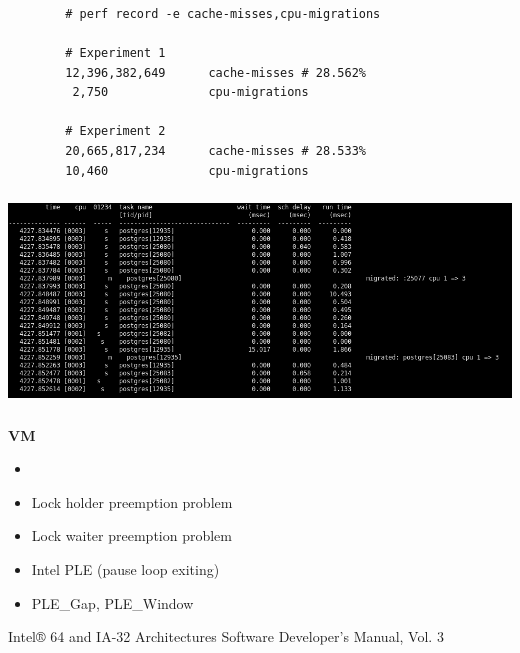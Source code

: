 \documentclass[usenames,dvipsnames, 18pt, compress, aspectratio=169]{beamer}
\begin{document}
\begin{frame}[fragile]{}
    \frametitle{}
    \begin{center}

        \begin{verbatim}
        # perf record -e cache-misses,cpu-migrations

        # Experiment 1
        12,396,382,649      cache-misses # 28.562%
         2,750              cpu-migrations

        # Experiment 2
        20,665,817,234      cache-misses # 28.533%
        10,460              cpu-migrations
        \end{verbatim}

    \end{center}
\end{frame}

\begin{frame}
    \frametitle{}
    \begin{center}

        \includegraphics[width=1.0\textwidth,center]{migrations.png}

    \end{center}
\end{frame}

\begin{frame}
    \frametitle{}
    \begin{center}
    \textbf{VM}

        \begin{itemize}
            \item <+->
        \end{itemize}

        \begin{itemize}[label={\MVRightarrow}]
            \item <+-> Lock holder preemption problem
            \item <+-> Lock waiter preemption problem
            \item <+-> Intel PLE (pause loop exiting)
            \item <+-> PLE\_Gap, PLE\_Window
        \end{itemize}

        \normalsize{Intel® 64 and IA-32 Architectures Software Developer's Manual, Vol. 3}
    \end{center}
\end{frame}
\end{document}

